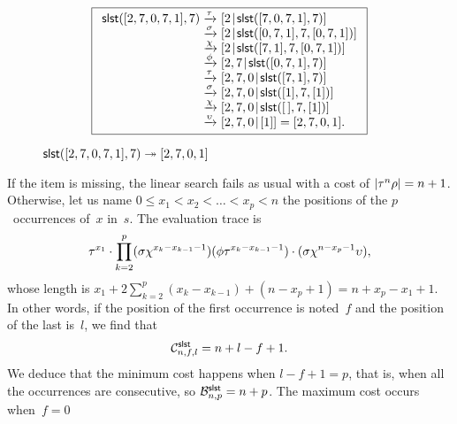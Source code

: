 \begin{figure}
\begin{equation*}
\boxed{%
\begin{array}{r@{\;}l@{\;}l}
\fun{slst}([2,7,0,7,1],7)
& \xrightarrow{\smash{\tau}}
& \cons{2}{\fun{slst}([7,0,7,1],7)}\\
& \xrightarrow{\smash{\sigma}}
& \cons{2}{\fun{slst}([0,7,1],7,[0,7,1])}\\
& \xrightarrow{\smash{\chi}}
& \cons{2}{\fun{slst}([7,1],7,[0,7,1])}\\
& \xrightarrow{\smash{\phi}}
& \cons{2,7}{\fun{slst}([0,7,1],7)}\\
& \xrightarrow{\smash{\tau}}
& \cons{2,7,0}{\fun{slst}([7,1],7)}\\
& \xrightarrow{\smash{\sigma}}
& \cons{2,7,0}{\fun{slst}([1],7,[1])}\\
& \xrightarrow{\smash{\chi}}
& \cons{2,7,0}{\fun{slst}(\el,7,[1])}\\
& \xrightarrow{\smash{\upsilon}}
& \cons{2,7,0}{[1]} = [2,7,0,1].
\end{array}}
\end{equation*}
\caption{\(\fun{slst}([2,7,0,7,1],7) \twoheadrightarrow
  [2,7,0,1]\)\label{fig:slst_27071}}
\end{figure}
If the item is missing, the linear search fails as usual with a cost
of \(\len{\tau^n\rho} = n + 1\). Otherwise, let us name \( 0 \leqslant
x_1 < x_2 < \dots < x_p < n\) the positions of the \(p\)~occurrences
of~\(x\) in~\(s\). The evaluation trace is
\begin{equation*}
\abovedisplayskip=0pt
\belowdisplayskip=0pt
\tau^{x_1}
\cdot
\prod_{k=2}^{p}(\sigma\chi^{x_k-x_{k-1}-1})(\phi\tau^{x_k-x_{k-1}-1})
\cdot
(\sigma\chi^{n-x_p-1}\upsilon),
\end{equation*}
whose length is \(x_1 + 2\sum_{k=2}^{p}(x_k-x_{k-1}) + (n - x_p + 1) =
n + x_p - x_1 + 1\). In other words, if the position of the first
occurrence is noted~\(f\) and the position of the last is~\(l\), we
find that
\begin{equation*}
\C{\fun{slst}}{n,f,l} = n + l - f + 1.
\end{equation*}
We deduce that the minimum cost happens when \(l-f+1 = p\), that is, when all the occurrences
are consecutive, so \(\B{\fun{slst}}{n,p} = n +
p\). The maximum
cost occurs when~\({f=0}\)
